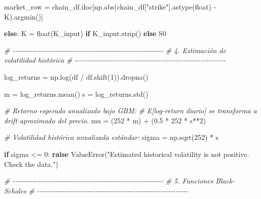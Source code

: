 \documentclass[
  11pt,
]{article}
\newenvironment{Shaded}{}{}
\newcommand{\BuiltInTok}[1]{\textcolor[rgb]{0.00,0.50,0.00}{#1}}
\newcommand{\CommentTok}[1]{\textcolor[rgb]{0.38,0.63,0.69}{\textit{#1}}}
\newcommand{\ControlFlowTok}[1]{\textcolor[rgb]{0.00,0.44,0.13}{\textbf{#1}}}
\newcommand{\DecValTok}[1]{\textcolor[rgb]{0.25,0.63,0.44}{#1}}
\newcommand{\FloatTok}[1]{\textcolor[rgb]{0.25,0.63,0.44}{#1}}
\newcommand{\NormalTok}[1]{#1}
\newcommand{\OperatorTok}[1]{\textcolor[rgb]{0.40,0.40,0.40}{#1}}
\newcommand{\PreprocessorTok}[1]{\textcolor[rgb]{0.74,0.48,0.00}{#1}}
\newcommand{\StringTok}[1]{\textcolor[rgb]{0.25,0.44,0.63}{#1}}
\begin{document}
\begin{Shaded}
\begin{Highlighting}[]
\NormalTok{    market\_row }\OperatorTok{=}\NormalTok{ chain\_df.iloc[np.}\BuiltInTok{abs}\NormalTok{(chain\_df[}\StringTok{"strike"}\NormalTok{].astype(}\BuiltInTok{float}\NormalTok{) }\OperatorTok{{-}}\NormalTok{ K).argmin()]}

\ControlFlowTok{else}\NormalTok{:}
\NormalTok{    K }\OperatorTok{=} \BuiltInTok{float}\NormalTok{(K\_input) }\ControlFlowTok{if}\NormalTok{ K\_input.strip() }\ControlFlowTok{else}\NormalTok{ S0}


\CommentTok{\# {-}{-}{-}{-}{-}{-}{-}{-}{-}{-}{-}{-}{-}{-}{-}{-}{-}{-}{-}{-}{-}{-}{-}{-}{-}{-}{-}{-}{-}{-}{-}{-}{-}{-}{-}{-}{-}{-}{-}{-}{-}{-}{-}{-}{-}{-}{-}{-}{-}{-}{-}{-}{-}{-}{-}{-}{-}{-}{-}{-}}
\CommentTok{\# 4. Estimación de volatilidad histórica}
\CommentTok{\# {-}{-}{-}{-}{-}{-}{-}{-}{-}{-}{-}{-}{-}{-}{-}{-}{-}{-}{-}{-}{-}{-}{-}{-}{-}{-}{-}{-}{-}{-}{-}{-}{-}{-}{-}{-}{-}{-}{-}{-}{-}{-}{-}{-}{-}{-}{-}{-}{-}{-}{-}{-}{-}{-}{-}{-}{-}{-}{-}{-}}

\NormalTok{log\_returns }\OperatorTok{=}\NormalTok{ np.log(df }\OperatorTok{/}\NormalTok{ df.shift(}\DecValTok{1}\NormalTok{)).dropna()}

\NormalTok{m }\OperatorTok{=}\NormalTok{ log\_returns.mean()}
\NormalTok{s }\OperatorTok{=}\NormalTok{ log\_returns.std()}

\CommentTok{\# Retorno esperado anualizado bajo GBM:}
\CommentTok{\# E[log{-}return diario] se transforma a drift aproximado del precio.}
\NormalTok{mu }\OperatorTok{=}\NormalTok{ (}\DecValTok{252} \OperatorTok{*}\NormalTok{ m) }\OperatorTok{+}\NormalTok{ (}\FloatTok{0.5} \OperatorTok{*} \DecValTok{252} \OperatorTok{*}\NormalTok{ s}\OperatorTok{**}\DecValTok{2}\NormalTok{)}

\CommentTok{\# Volatilidad histórica anualizada estándar:}
\NormalTok{sigma }\OperatorTok{=}\NormalTok{ np.sqrt(}\DecValTok{252}\NormalTok{) }\OperatorTok{*}\NormalTok{ s}

\ControlFlowTok{if}\NormalTok{ sigma }\OperatorTok{\textless{}=} \DecValTok{0}\NormalTok{:}
    \ControlFlowTok{raise} \PreprocessorTok{ValueError}\NormalTok{(}\StringTok{"Estimated historical volatility is not positive. Check the data."}\NormalTok{)}


\CommentTok{\# {-}{-}{-}{-}{-}{-}{-}{-}{-}{-}{-}{-}{-}{-}{-}{-}{-}{-}{-}{-}{-}{-}{-}{-}{-}{-}{-}{-}{-}{-}{-}{-}{-}{-}{-}{-}{-}{-}{-}{-}{-}{-}{-}{-}{-}{-}{-}{-}{-}{-}{-}{-}{-}{-}{-}{-}{-}{-}{-}{-}}
\CommentTok{\# 5. Funciones Black{-}Scholes}
\CommentTok{\# {-}{-}{-}{-}{-}{-}{-}{-}{-}{-}{-}{-}{-}{-}{-}{-}{-}{-}{-}{-}{-}{-}{-}{-}{-}{-}{-}{-}{-}{-}{-}{-}{-}{-}{-}{-}{-}{-}{-}{-}{-}{-}{-}{-}{-}{-}{-}{-}{-}{-}{-}{-}{-}{-}{-}{-}{-}{-}{-}{-}}


\end{Highlighting}
\end{Shaded}
\end{document}
